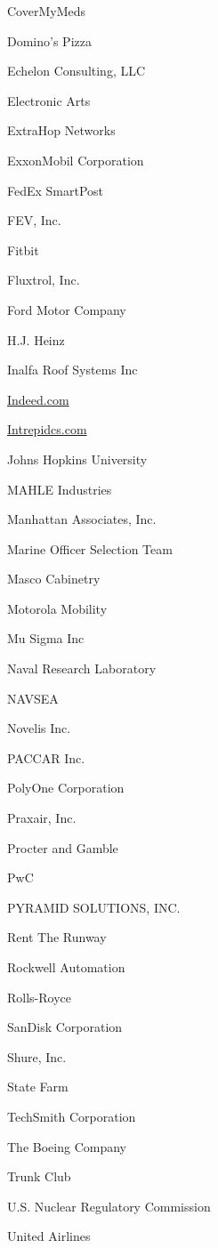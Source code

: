\documentclass[twoside]{article}
\begin{document}
\begin{center}
\begin{multicols}{5}
\begin{FlushLeft}
\begin{compactitem}
\item CoverMyMeds
\item Domino's Pizza
\item Echelon Consulting, LLC
\item Electronic Arts
\item ExtraHop Networks
\item ExxonMobil Corporation
\item FedEx SmartPost
\item FEV, Inc.
\item Fitbit
\item Fluxtrol, Inc.
\item Ford Motor Company
\item H.J. Heinz
\item Inalfa Roof Systems Inc
\item \url{Indeed.com}
\item \url{Intrepidcs.com}
\item Johns Hopkins University
\item MAHLE Industries
\item Manhattan Associates, Inc.
\item Marine Officer Selection Team
\item Masco Cabinetry
\item Motorola Mobility
\item Mu Sigma Inc
\item Naval Research Laboratory
\item NAVSEA
\item Novelis Inc.
\item PACCAR Inc.
\item PolyOne Corporation
\item Praxair, Inc.
\item Procter and Gamble
\item PwC
\item PYRAMID SOLUTIONS, INC.
\item Rent The Runway
\item Rockwell Automation
\item Rolls-Royce
\item SanDisk Corporation
\item Shure, Inc.
\item State Farm
\item TechSmith Corporation
\item The Boeing Company
\item Trunk Club
\item U.S. Nuclear Regulatory Commission
\item United Airlines

\end{compactitem}
\end{FlushLeft}
\end{multicols}
\end{center}
\end{document}
